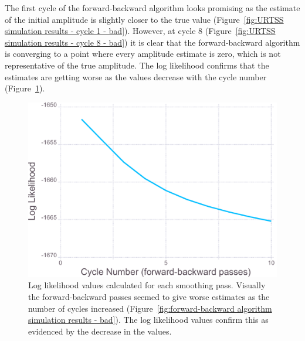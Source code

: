 The first cycle of the forward-backward algorithm looks promising as the estimate of the initial amplitude is slightly closer to the true value (Figure~\ref{fig:URTSS simulation results - cycle 1 - bad}).
However, at cycle 8 (Figure~\ref{fig:URTSS simulation results - cycle 8 - bad}) it is clear that the forward-backward algorithm is converging to a point where every amplitude estimate is zero, which is not representative of the true amplitude.
The log likelihood confirms that the estimates are getting worse as the values decrease with the cycle number (Figure~\ref{fig:Simulation Log likelihood - bad}).

\begin{figure}[ht!]
    \centering
    \includegraphics[width=1.0\textwidth]{figures/datared/loglik_bad.pdf}
    \caption[Log likelihood values calculated at the end of each smoothing pass for a strong reflection.]{Log likelihood values calculated for each smoothing pass.
    Visually the forward-backward passes seemed to give worse estimates as the number of cycles increased (Figure~\ref{fig:forward-backward algorithm simulation results - bad}).
    The log likelihood values confirm this as evidenced by the decrease in the values.}
    \label{fig:Simulation Log likelihood - bad}
\end{figure}

